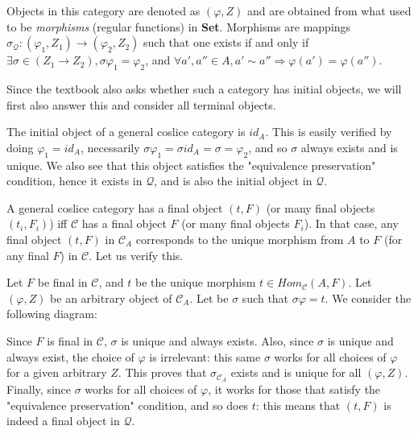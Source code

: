 \documentclass[12pt, letterpaper, twoside]{report}
\begin{document}
Objects in this category are denoted as $(\varphi, Z)$ and are obtained from what used to be \textit{morphisms} (regular functions) in \textbf{Set}. Morphisms are mappings $\sigma_{\mathcal{Q}} : (\varphi_1, Z_1) \to (\varphi_2, Z_2)$ such that one exists if and only if $\exists \sigma \in (Z_1 \to Z_2), \sigma \varphi_1 = \varphi_2$, and $\forall a', a'' \in A, a' \sim a'' \Rightarrow \varphi(a') = \varphi(a'')$.

Since the textbook also asks whether such a category has initial objects, we will first also answer this and consider all terminal objects.

The initial object of a general coslice category is $id_A$. This is easily verified by doing $\varphi_1 = id_A$, necessarily $\sigma \varphi_1 = \sigma id_A = \sigma = \varphi_2$, and so $\sigma$ always exists and is unique. We also see that this object satisfies the "equivalence preservation" condition, hence it exists in $\mathcal{Q}$, and is also the initial object in $\mathcal{Q}$.

A general coslice category has a final object $(t, F)$ (or many final objects $(t_i, F_i)$) iff $\mathcal{C}$ has a final object $F$ (or many final objects $F_i$). In that case, any final object $(t, F)$ in $\mathcal{C}_A$ corresponds to the unique morphism from $A$ to $F$ (for any final $F$) in $\mathcal{C}$. Let us verify this.

Let $F$ be final in $\mathcal{C}$, and $t$ be the unique morphism $t \in Hom_{\mathcal{C}} (A, F)$. Let $(\varphi, Z)$ be an arbitrary object of $\mathcal{C}_A$. Let be $\sigma$ such that $\sigma \varphi = t$. We consider the following diagram:


Since $F$ is final in $\mathcal{C}$, $\sigma$ is unique and always exists. Also, since $\sigma$ is unique and always exist, the choice of $\varphi$ is irrelevant: this same $\sigma$ works for all choices of $\varphi$ for a given arbitrary $Z$. This proves that $\sigma_{\mathcal{C}_A}$ exists and is unique for all $(\varphi, Z)$. Finally, since $\sigma$ works for all choices of $\varphi$, it works for those that satisfy the "equivalence preservation" condition, and so does $t$: this means that $(t, F)$ is indeed a final object in $\mathcal{Q}$.
\end{document}
